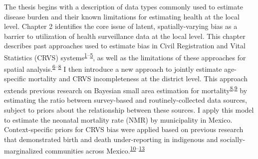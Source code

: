 \documentclass[
]{article}
\begin{document}
The thesis begins with a description of data types commonly used to estimate disease burden and their known limitations for estimating health at the local level. Chapter 2 identifies the core issue of latent, spatially-varying bias as a barrier to utilization of health surveillance data at the local level. This chapter describes past approaches used to estimate bias in Civil Registration and Vital Statistics (CRVS) systems\textsuperscript{\protect\hyperlink{ref-ChandraSekar1949}{1}--\protect\hyperlink{ref-Murray2010}{5}}, as well as the limitations of these approaches for spatial analysis.\textsuperscript{\protect\hyperlink{ref-Tilling2001}{6}--\protect\hyperlink{ref-Schmertmann2018a}{8}} I then introduce a new approach to jointly estimate age-specific mortality and CRVS incompleteness at the district level. This approach extends previous research on Bayesian small area estimation for mortality\textsuperscript{\protect\hyperlink{ref-Schmertmann2018a}{8},\protect\hyperlink{ref-Wakefield2019}{9}} by estimating the ratio between survey-based and routinely-collected data sources, subject to priors about the relationship between these sources. I apply this model to estimate the neonatal mortality rate (NMR) by municipality in Mexico. Context-specific priors for CRVS bias were applied based on previous research that demonstrated birth and death under-reporting in indigenous and socially-marginalized communities across Mexico.\textsuperscript{\protect\hyperlink{ref-Hernandez2012}{10}--\protect\hyperlink{ref-Paulino2019}{13}}
\end{document}

